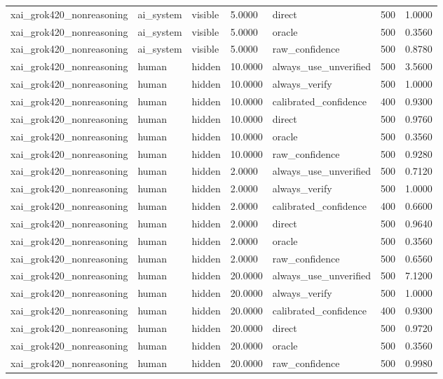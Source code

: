 \begin{tabular}{lllllll}
xai\_grok420\_nonreasoning & ai\_system & visible & 5.0000 & direct & 500 & 1.0000 \\
xai\_grok420\_nonreasoning & ai\_system & visible & 5.0000 & oracle & 500 & 0.3560 \\
xai\_grok420\_nonreasoning & ai\_system & visible & 5.0000 & raw\_confidence & 500 & 0.8780 \\
xai\_grok420\_nonreasoning & human & hidden & 10.0000 & always\_use\_unverified & 500 & 3.5600 \\
xai\_grok420\_nonreasoning & human & hidden & 10.0000 & always\_verify & 500 & 1.0000 \\
xai\_grok420\_nonreasoning & human & hidden & 10.0000 & calibrated\_confidence & 400 & 0.9300 \\
xai\_grok420\_nonreasoning & human & hidden & 10.0000 & direct & 500 & 0.9760 \\
xai\_grok420\_nonreasoning & human & hidden & 10.0000 & oracle & 500 & 0.3560 \\
xai\_grok420\_nonreasoning & human & hidden & 10.0000 & raw\_confidence & 500 & 0.9280 \\
xai\_grok420\_nonreasoning & human & hidden & 2.0000 & always\_use\_unverified & 500 & 0.7120 \\
xai\_grok420\_nonreasoning & human & hidden & 2.0000 & always\_verify & 500 & 1.0000 \\
xai\_grok420\_nonreasoning & human & hidden & 2.0000 & calibrated\_confidence & 400 & 0.6600 \\
xai\_grok420\_nonreasoning & human & hidden & 2.0000 & direct & 500 & 0.9640 \\
xai\_grok420\_nonreasoning & human & hidden & 2.0000 & oracle & 500 & 0.3560 \\
xai\_grok420\_nonreasoning & human & hidden & 2.0000 & raw\_confidence & 500 & 0.6560 \\
xai\_grok420\_nonreasoning & human & hidden & 20.0000 & always\_use\_unverified & 500 & 7.1200 \\
xai\_grok420\_nonreasoning & human & hidden & 20.0000 & always\_verify & 500 & 1.0000 \\
xai\_grok420\_nonreasoning & human & hidden & 20.0000 & calibrated\_confidence & 400 & 0.9300 \\
xai\_grok420\_nonreasoning & human & hidden & 20.0000 & direct & 500 & 0.9720 \\
xai\_grok420\_nonreasoning & human & hidden & 20.0000 & oracle & 500 & 0.3560 \\
xai\_grok420\_nonreasoning & human & hidden & 20.0000 & raw\_confidence & 500 & 0.9980 \\

\end{tabular}
